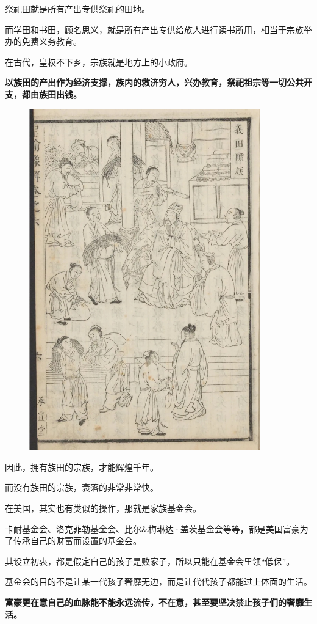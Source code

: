 \documentclass[UTF8, 11pt, oneside]{ctexart}
\newcommand{\zd}[1]{\textbf{\textcolor[RGB]{123,12,0}{#1}}} %
\begin{document}
祭祀田就是所有产出专供祭祀的田地。

而学田和书田，顾名思义，就是所有产出专供给族人进行读书所用，相当于宗族举办的免费义务教育。

在古代，皇权不下乡，宗族就是地方上的小政府。

\zd{以族田的产出作为经济支撑，族内的救济穷人，兴办教育，祭祀祖宗等一切公共开支，都由族田出钱。}

\begin{figure}[H]
    \centering
    \includegraphics[width=10cm]{2024-03-20-003}
\end{figure}

因此，拥有族田的宗族，才能辉煌千年。

而没有族田的宗族，衰落的非常非常快。

在美国，其实也有类似的操作，那就是家族基金会。

卡耐基金会、洛克菲勒基金会、比尔\&梅琳达·盖茨基金会等等，都是美国富豪为了传承自己的财富而设置的基金会。

其设立初衷，都是假定自己的孩子是败家子，所以只能在基金会里领“低保”。

基金会的目的不是让某一代孩子奢靡无边，而是让代代孩子都能过上体面的生活。

\zd{富豪更在意自己的血脉能不能永远流传，不在意，甚至要坚决禁止孩子们的奢靡生活。}
\end{document}
